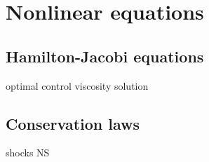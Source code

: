 \documentclass{../../large}
\begin{document}
\part{Nonlinear equations}

\chapter{}

\chapter{Hamilton-Jacobi equations}
optimal control
viscosity solution

\chapter{Conservation laws}
shocks
NS
\end{document}
